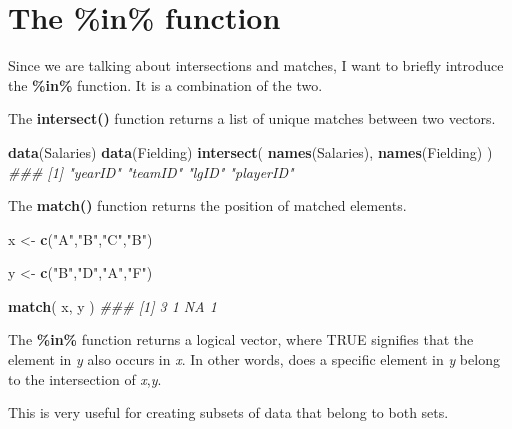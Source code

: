\documentclass[]{book}
\newenvironment{Shaded}{\begin{snugshade}}{\end{snugshade}}
\newcommand{\CommentTok}[1]{\textcolor[rgb]{0.56,0.35,0.01}{\textit{#1}}}
\newcommand{\KeywordTok}[1]{\textcolor[rgb]{0.13,0.29,0.53}{\textbf{#1}}}
\newcommand{\NormalTok}[1]{#1}
\newcommand{\StringTok}[1]{\textcolor[rgb]{0.31,0.60,0.02}{#1}}
\theoremstyle{definition}
\theoremstyle{definition}
\theoremstyle{definition}
\theoremstyle{remark}
\begin{document}
\hypertarget{the-in-function}{%
\section{The \%in\% function}\label{the-in-function}}

Since we are talking about intersections and matches, I want to briefly
introduce the \textbf{\%in\%} function. It is a combination of the two.

The \textbf{intersect()} function returns a list of unique matches
between two vectors.

\begin{Shaded}
\begin{Highlighting}[]
\KeywordTok{data}\NormalTok{(Salaries)}
\KeywordTok{data}\NormalTok{(Fielding)}
\KeywordTok{intersect}\NormalTok{( }\KeywordTok{names}\NormalTok{(Salaries), }\KeywordTok{names}\NormalTok{(Fielding) )}
\CommentTok{### [1] "yearID"   "teamID"   "lgID"     "playerID"}
\end{Highlighting}
\end{Shaded}

The \textbf{match()} function returns the position of matched elements.

\begin{Shaded}
\begin{Highlighting}[]
\NormalTok{x <-}\StringTok{ }\KeywordTok{c}\NormalTok{(}\StringTok{"A"}\NormalTok{,}\StringTok{"B"}\NormalTok{,}\StringTok{"C"}\NormalTok{,}\StringTok{"B"}\NormalTok{)}

\NormalTok{y <-}\StringTok{ }\KeywordTok{c}\NormalTok{(}\StringTok{"B"}\NormalTok{,}\StringTok{"D"}\NormalTok{,}\StringTok{"A"}\NormalTok{,}\StringTok{"F"}\NormalTok{)}

\KeywordTok{match}\NormalTok{( x, y )}
\CommentTok{### [1]  3  1 NA  1}
\end{Highlighting}
\end{Shaded}

The \textbf{\%in\%} function returns a logical vector, where TRUE
signifies that the element in \emph{y} also occurs in \emph{x}. In other
words, does a specific element in \emph{y} belong to the intersection of
\emph{x},\emph{y}.

This is very useful for creating subsets of data that belong to both
sets.
\end{document}
